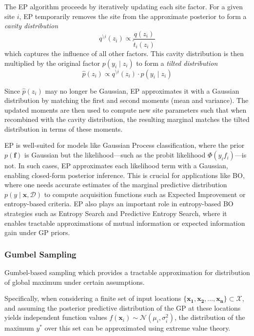\documentclass{ut-thesis}
\begin{document}
The EP algorithm proceeds by iteratively updating each site factor. For a given site $i$, EP temporarily removes the site from the approximate posterior to form a \emph{cavity distribution}
\begin{equation}
    q^{\setminus i}(z_i) \propto \frac{q(z_i)}{\tilde{t}_i(z_i)}
\end{equation}
which captures the influence of all other factors. This cavity distribution is then multiplied by the original factor $p(y_i \mid z_i)$ to form a \emph{tilted distribution}
\begin{equation}
    \hat{p}(z_i) \propto q^{\setminus i}(z_i) \cdot p(y_i \mid z_i)
\end{equation}

Since $\hat{p}(z_i)$ may no longer be Gaussian, EP approximates it with a Gaussian distribution by matching the first and second moments (mean and variance). The updated moments are then used to compute new site parameters such that when recombined with the cavity distribution, the resulting marginal matches the tilted distribution in terms of these moments. 

EP is well-suited for models like Gaussian Process classification, where the prior $p(\mathbf{f})$ is Gaussian but the likelihood—such as the probit likelihood $\Phi(y_i f_i)$—is not. In such cases, EP approximates each likelihood term with a Gaussian, enabling closed-form posterior inference. This is crucial for applications like BO, where one needs accurate estimates of the marginal predictive distribution $p(y \mid \mathbf{x}, \mathcal{D})$ to compute acquisition functions such as Expected Improvement or entropy-based criteria. EP also plays an important role in entropy-based BO strategies such as Entropy Search and Predictive Entropy Search, where it enables tractable approximations of mutual information or expected information gain under GP priors.

\subsubsection{Gumbel Sampling}

Gumbel-based sampling which provides a tractable approximation for distribution of global maximum under certain assumptions\cite{wang2017max}. 

Specifically, when considering a finite set of input locations \( \{\mathbf{x_1}, \mathbf{x_2}, \dots, \mathbf{x_n}\} \subset \mathcal{X} \), and assuming the posterior predictive distribution of the GP at these locations yields independent function values \( f(\mathbf{x}_i) \sim \mathcal{N}(\mu_i, \sigma_i^2) \), the distribution of the maximum \( y^* \) over this set can be approximated using extreme value theory.
\end{document}
